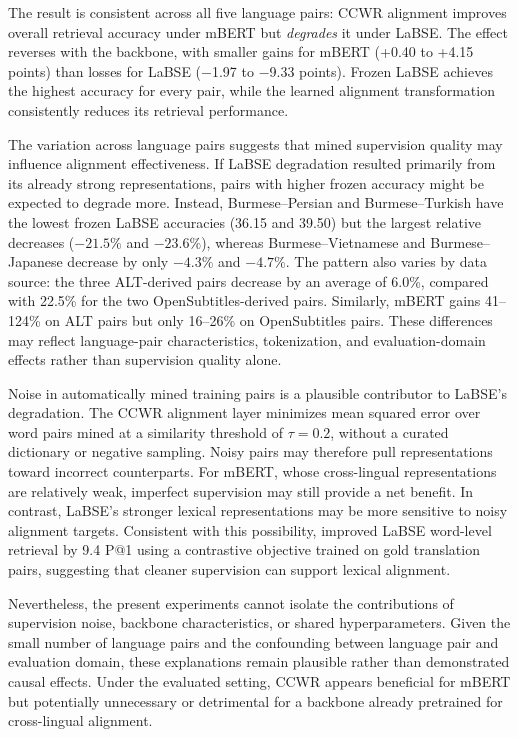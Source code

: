 \documentclass[11pt]{article}
\begin{document}
The result is consistent across all five language pairs:
CCWR alignment improves overall retrieval accuracy
under mBERT but \emph{degrades} it under LaBSE.
The effect reverses with the backbone, with smaller
gains for mBERT (+0.40 to +4.15 points) than losses
for LaBSE ($-$1.97 to $-$9.33 points). Frozen LaBSE achieves the highest accuracy
for every pair, while the learned alignment
transformation consistently reduces its
retrieval performance.

The variation across language pairs suggests that
mined supervision quality may influence alignment
effectiveness. If LaBSE degradation resulted
primarily from its already strong representations,
pairs with higher frozen accuracy might be expected
to degrade more. Instead, Burmese--Persian and
Burmese--Turkish have the lowest frozen LaBSE
accuracies (36.15 and 39.50) but the largest
relative decreases ($-21.5\%$ and $-23.6\%$),
whereas Burmese--Vietnamese and Burmese--Japanese
decrease by only $-4.3\%$ and $-4.7\%$.
The pattern also varies by data source:
the three ALT-derived pairs decrease by an average
of 6.0\%, compared with 22.5\% for the two
OpenSubtitles-derived pairs. Similarly, mBERT gains
41--124\% on ALT pairs but only 16--26\% on
OpenSubtitles pairs. These differences may reflect
language-pair characteristics, tokenization, and
evaluation-domain effects rather than supervision
quality alone.

Noise in automatically mined training pairs is
a plausible contributor to LaBSE's degradation.
The CCWR alignment layer minimizes mean squared
error over word pairs mined at a similarity threshold
of $\tau=0.2$, without a curated dictionary or
negative sampling. Noisy pairs may therefore pull
representations toward incorrect counterparts.
For mBERT, whose cross-lingual representations
are relatively weak, imperfect supervision may
still provide a net benefit. In contrast, LaBSE's
stronger lexical representations may be more
sensitive to noisy alignment targets.
Consistent with this possibility,
\citet{vulic-etal-2023-probing} improved LaBSE
word-level retrieval by 9.4 P@1 using a contrastive
objective trained on gold translation pairs,
suggesting that cleaner supervision can support
lexical alignment.

Nevertheless, the present experiments cannot
isolate the contributions of supervision noise,
backbone characteristics, or shared hyperparameters.
Given the small number of language pairs and the
confounding between language pair and evaluation
domain, these explanations remain plausible rather
than demonstrated causal effects. Under the
evaluated setting, CCWR appears beneficial for
mBERT but potentially unnecessary or detrimental
for a backbone already pretrained for
cross-lingual alignment.
\end{document}
